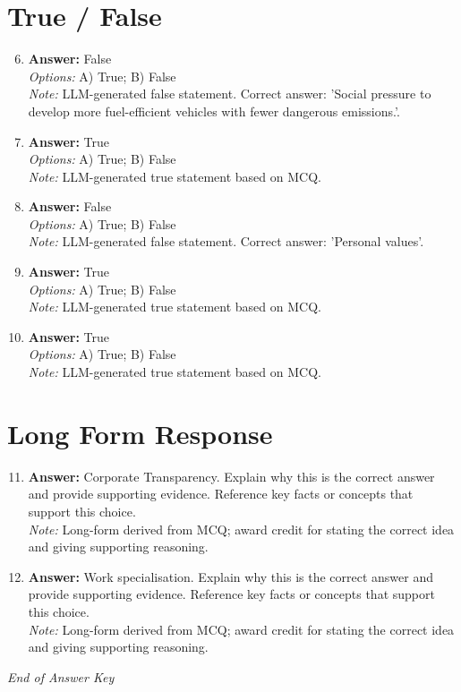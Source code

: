\documentclass[12pt]{article}
\begin{document}
\section*{True / False}
\begin{enumerate}[label=\arabic*.]
\setcounter{enumi}{5}
\item \textbf{Answer:} False
\\ \textit{Options:} A) True; B) False
\\ \textit{Note:} LLM-generated false statement. Correct answer: 'Social pressure to develop more fuel-efficient vehicles with fewer dangerous emissions.'.
\item \textbf{Answer:} True
\\ \textit{Options:} A) True; B) False
\\ \textit{Note:} LLM-generated true statement based on MCQ.
\item \textbf{Answer:} False
\\ \textit{Options:} A) True; B) False
\\ \textit{Note:} LLM-generated false statement. Correct answer: 'Personal values'.
\item \textbf{Answer:} True
\\ \textit{Options:} A) True; B) False
\\ \textit{Note:} LLM-generated true statement based on MCQ.
\item \textbf{Answer:} True
\\ \textit{Options:} A) True; B) False
\\ \textit{Note:} LLM-generated true statement based on MCQ.
\end{enumerate}

\section*{Long Form Response}
\begin{enumerate}[label=\arabic*.]
\setcounter{enumi}{10}
\item \textbf{Answer:} Corporate Transparency. Explain why this is the correct answer and provide supporting evidence. Reference key facts or concepts that support this choice.
\\ \textit{Note:} Long-form derived from MCQ; award credit for stating the correct idea and giving supporting reasoning.
\item \textbf{Answer:} Work specialisation. Explain why this is the correct answer and provide supporting evidence. Reference key facts or concepts that support this choice.
\\ \textit{Note:} Long-form derived from MCQ; award credit for stating the correct idea and giving supporting reasoning.
\end{enumerate}

\vfill
\noindent\textit{End of Answer Key}
\end{document}
